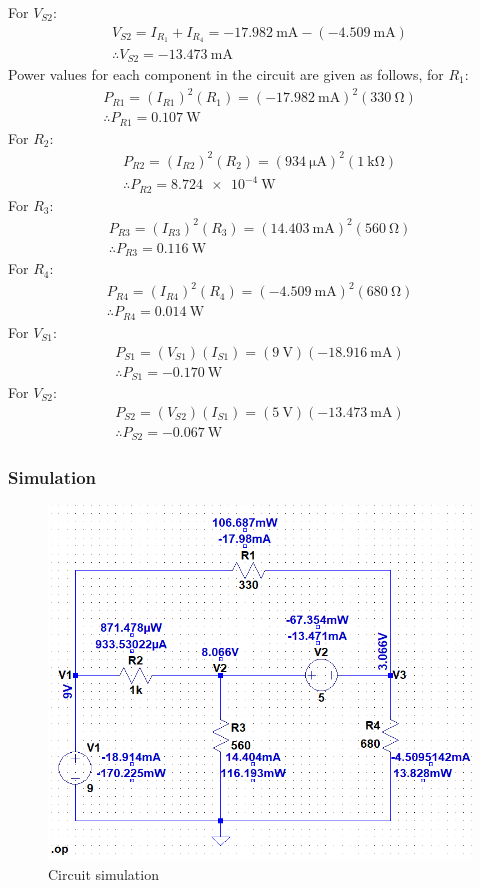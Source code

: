 \documentclass[letterpaper]{article}
\begin{document}
For $V_{S2}$:
\begin{gather*}
    V_{S2} = I_{R_1}+I_{R_4} =
    \SI{-17.982}{\milli\ampere}-(\SI{-4.509}{\milli\ampere})\\
    \therefore V_{S2} = \SI{-13.473}{\milli\ampere}
\end{gather*}
Power values for each component in the circuit are given as follows, for $R_1$:
\begin{gather*}
    P_{R1}=(I_{R1})^2(R_1)=(\SI{-17.982}{\milli\ampere})^2(\SI{330}{\ohm})\\
    \therefore P_{R1}=\SI{0.107}{\watt}
\end{gather*}
For $R_2$:
\begin{gather*}
    P_{R2}=(I_{R2})^2(R_2)=(\SI{934}{\micro\ampere})^2(\SI{1}{\kilo\ohm})\\
    \therefore P_{R2}=\SI{8.724e-4}{\watt}
\end{gather*}
For $R_3$:
\begin{gather*}
    P_{R3}=(I_{R3})^2(R_3)=(\SI{14.403}{\milli\ampere})^2(\SI{560}{\ohm})\\
    \therefore P_{R3}=\SI{0.116}{\watt}
\end{gather*}
For $R_4$:
\begin{gather*}
    P_{R4}=(I_{R4})^2(R_4)=(\SI{-4.509}{\milli\ampere})^2(\SI{680}{\ohm})\\
    \therefore P_{R4}=\SI{0.014}{\watt}
\end{gather*}
For $V_{S1}$:
\begin{gather*}
    P_{S1}=(V_{S1})(I_{S1})=(\SI{9}{\volt})(\SI{-18.916}{\milli\ampere})\\
    \therefore P_{S1}=\SI{-0.170}{\watt}
\end{gather*}
For $V_{S2}$:
\begin{gather*}
    P_{S2}=(V_{S2})(I_{S1})=(\SI{5}{\volt})(\SI{-13.473}{\milli\ampere})\\
    \therefore P_{S2}=\SI{-0.067}{\watt}
\end{gather*}
\subsubsection{Simulation}
\begin{figure}[H]
    \centering
    \includegraphics[width=.65\linewidth]{img/sim1}
    \caption{Circuit simulation}
\end{figure}
\end{document}
